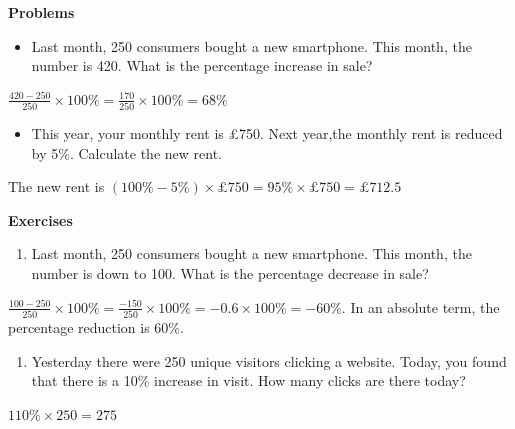 \documentclass[
  letterpaper,
  DIV=11,
  numbers=noendperiod]{scrartcl}
\providecommand{\tightlist}{%
  \setlength{\itemsep}{0pt}\setlength{\parskip}{0pt}}\usepackage{longtable,booktabs,array}
\begin{document}
\textbf{Problems}

\begin{itemize}
\tightlist
\item
  Last month, 250 consumers bought a new smartphone. This month, the
  number is 420. What is the percentage increase in sale?
\end{itemize}

\(\frac{420-250}{250} \times 100 \% =\frac{170}{250} \times 100 \% =68 \%\)

\begin{itemize}
\tightlist
\item
  This year, your monthly rent is £750. Next year,the monthly rent is
  reduced by 5\%. Calculate the new rent.
\end{itemize}

The new rent is
\((100 \% - 5 \%) \times £ 750 = 95 \% \times £750 = £712.5\)

\textbf{Exercises}

\begin{enumerate}
\def\labelenumi{\arabic{enumi}.}
\tightlist
\item
  Last month, 250 consumers bought a new smartphone. This month, the
  number is down to 100. What is the percentage decrease in sale?
\end{enumerate}

\(\frac{100-250}{250} \times 100 \% =\frac{-150}{250} \times 100 \% = -0.6 \times 100 \% = -60 \%\).
In an absolute term, the percentage reduction is 60\%.

\begin{enumerate}
\def\labelenumi{\arabic{enumi}.}
\setcounter{enumi}{1}
\tightlist
\item
  Yesterday there were 250 unique visitors clicking a website. Today,
  you found that there is a 10\% increase in visit. How many clicks are
  there today?
\end{enumerate}

\(110 \% \times 250 = 275\)
\end{document}
